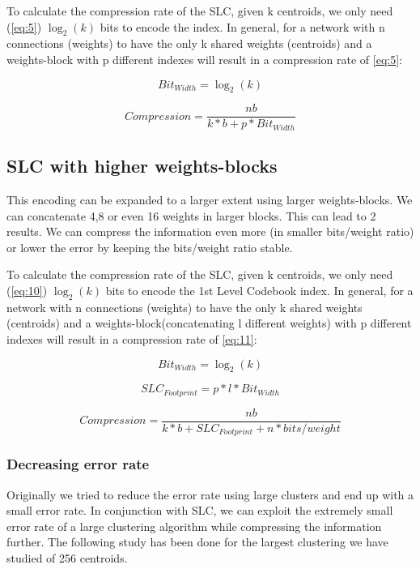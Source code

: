 To calculate the compression rate of the SLC, given k centroids, we only need (\ref{eq:5}) $\log_2(k)$ bits to encode the index. In general, for a network with n connections (weights) to have the only k shared weights (centroids) and a weights-block with p different indexes will result in a compression rate of \ref{eq:5}: 

\begin{equation}\label{eq:10}
  Bit_{Width}= \log_2(k) \end{equation}
 

  
 \begin{equation}\label{eq:12}
 Compression = \frac{nb}{k*b+p*Bit_{Width}} \end{equation}
 
 

 
 
 \subsection{SLC with higher weights-blocks }
 This encoding can be expanded to a larger extent using larger weights-blocks. We can concatenate 4,8 or even 16 weights in larger blocks.
 This can lead to 2 results. We can compress the information even more (in smaller bits/weight ratio) or lower the error by keeping the bits/weight ratio stable.
 
  To calculate the compression rate of the SLC, given k centroids, we only need (\ref{eq:10}) $\log_2(k)$ bits to encode the 1st Level Codebook index. In general, for a network with n connections (weights) to have the only k shared weights (centroids) and a weights-block(concatenating l different weights) with p different indexes will result in a compression rate of \ref{eq:11}: 

\begin{equation}\label{eq:10}
  Bit_{Width}= \log_2(k) \end{equation}
 
\begin{equation}\label{eq:SLC_footprint}
  SLC_{Footprint}= p*l*Bit_{Width} \end{equation}
  
 \begin{equation}\label{eq:11}
 Compression = \frac{nb}{k*b+SLC_{Footprint}+n*bits/weight} \end{equation}
 
 
\subsubsection{Decreasing error rate}
Originally we tried to reduce the error rate using large clusters and end up with a small error rate. In conjunction with SLC, we can exploit the extremely small error rate of a large clustering algorithm while compressing the information further. The following study has been done for the largest clustering we have studied of 256 centroids.


